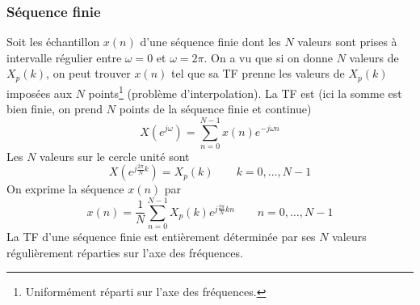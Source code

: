		\subsubsection{Séquence finie}
		Soit les échantillon $x(n)$ d'une séquence finie dont les $N$ valeurs sont prises à intervalle 
		régulier entre $\omega=0$ et $\omega=2\pi$. On a vu que si on donne $N$ valeurs de $X_p(k)$, 
		on peut trouver $x(n)$ tel que sa TF prenne les valeurs de $X_p(k)$ imposées aux $N$ points\footnote{
		Uniformément réparti sur l'axe des fréquences.} (problème d'interpolation). La TF est (ici la somme 
		est bien finie, on prend $N$ points de la séquence finie et continue)
		\begin{equation}
		X(e^{j\omega}) = \sum_{n=0}^{N-1} x(n)e^{-j\omega n}
		\end{equation}
		Les $N$ valeurs sur le cercle unité sont 
		\begin{equation}
		X(e^{j\frac{2\pi}{N}k}) = X_p(k)\qquad k=0,\dots,N-1
		\end{equation}
		On exprime la séquence $x(n)$ par
		\begin{equation}
		x(n) = \frac{1}{N}\sum_{n=0}^{N-1} X_p(k)e^{j\frac{2\pi}{N}kn}\qquad n=0,\dots,N-1
		\end{equation}
		La TF d'une séquence finie est entièrement déterminée par ses $N$ valeurs régulièrement 
		réparties sur l'axe des fréquences.
	
	
